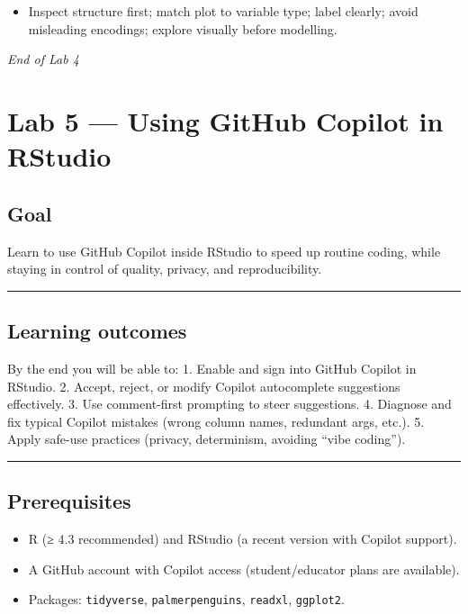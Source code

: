 \documentclass[
  letterpaper,
  DIV=11,
  numbers=noendperiod]{scrreprt}
\providecommand{\tightlist}{%
  \setlength{\itemsep}{0pt}\setlength{\parskip}{0pt}}
\begin{document}
\begin{itemize}
\tightlist
\item
  Inspect structure first; match plot to variable type; label clearly;
  avoid misleading encodings; explore visually before modelling.
\end{itemize}

\emph{End of Lab 4}


\chapter{Lab 5 --- Using GitHub Copilot in
RStudio}\label{lab-5-using-github-copilot-in-rstudio}

\section{Goal}\label{goal}

Learn to use GitHub Copilot inside RStudio to speed up routine coding,
while staying in control of quality, privacy, and reproducibility.

\begin{center}\rule{0.5\linewidth}{0.5pt}\end{center}

\section{Learning outcomes}\label{learning-outcomes-4}

By the end you will be able to: 1. Enable and sign into GitHub Copilot
in RStudio. 2. Accept, reject, or modify Copilot autocomplete
suggestions effectively. 3. Use comment-first prompting to steer
suggestions. 4. Diagnose and fix typical Copilot mistakes (wrong column
names, redundant args, etc.). 5. Apply safe-use practices (privacy,
determinism, avoiding ``vibe coding'').

\begin{center}\rule{0.5\linewidth}{0.5pt}\end{center}

\section{Prerequisites}\label{prerequisites-4}

\begin{itemize}
\tightlist
\item
  R (≥ 4.3 recommended) and RStudio (a recent version with Copilot
  support).
\item
  A GitHub account with Copilot access (student/educator plans are
  available).
\item
  Packages: \texttt{tidyverse}, \texttt{palmerpenguins},
  \texttt{readxl}, \texttt{ggplot2}.
\end{itemize}
\end{document}
